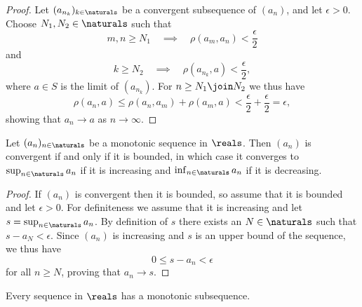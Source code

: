 \documentclass[article, a4paper, 11pt, oneside]{memoir}
\numberwithin{equation}{chapter}
\begin{document}
\begin{proof}
    Let $(a_{n_k})_{k\in\naturals}$ be a convergent subsequence of $(a_n)$, and let $\epsilon > 0$. Choose $N_1, N_2 \in \naturals$ such that
    \begin{equation*}
        m,n \geq N_1
        \quad \implies \quad
        \rho(a_m, a_n) < \frac{\epsilon}{2}
    \end{equation*}
    and
    \begin{equation*}
        k \geq N_2
        \quad \implies \quad
        \rho(a_{n_k}, a) < \frac{\epsilon}{2},
    \end{equation*}
    where $a \in S$ is the limit of $(a_{n_k})$. For $n \geq N_1 \join N_2$ we thus have
    \begin{equation*}
        \rho(a_n, a)
            \leq \rho(a_n, a_m) + \rho(a_m, a)
            < \frac{\epsilon}{2} + \frac{\epsilon}{2}
            = \epsilon,
    \end{equation*}
    showing that $a_n \to a$ as $n \to \infty$.
\end{proof}


\begin{proposition}
    Let $(a_n)_{n\in\naturals}$ be a monotonic sequence in $\reals$. Then $(a_n)$ is convergent if and only if it is bounded, in which case it converges to $\sup_{n\in\naturals} a_n$ if it is increasing and $\inf_{n\in\naturals} a_n$ if it is decreasing.
\end{proposition}

\begin{proof}
    If $(a_n)$ is convergent then it is bounded, so assume that it is bounded and let $\epsilon > 0$. For definiteness we assume that it is increasing and let $s = \sup_{n\in\naturals} a_n$. By definition of $s$ there exists an $N \in \naturals$ such that $s - a_N < \epsilon$. Since $(a_n)$ is increasing and $s$ is an upper bound of the sequence, we thus have
    \begin{equation*}
        0 \leq s - a_n < \epsilon
    \end{equation*}
    for all $n \geq N$, proving that $a_n \to s$.
\end{proof}

\begin{lemma}
    Every sequence in $\reals$ has a monotonic subsequence.
\end{lemma}
\end{document}
